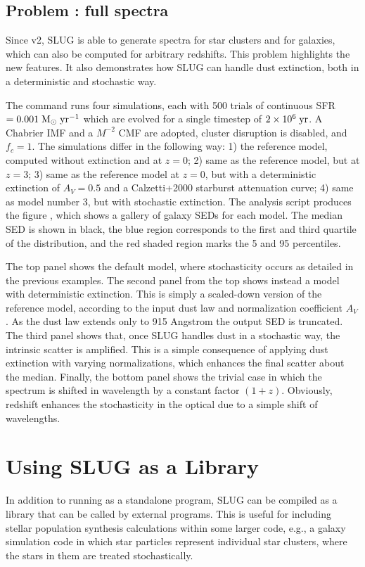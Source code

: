 \documentclass[letterpaper,10pt,english]{sphinxmanual}
\begin{document}
\section{Problem : full spectra}
\label{\detokenize{tests:problem-spectra-full-spectra}}
Since v2, SLUG is able to generate spectra for star clusters and for galaxies, which can also be computed for
arbitrary redshifts. This problem highlights the new features.
It also demonstrates how SLUG can handle dust extinction, both in a deterministic and stochastic way.

The command   runs four  simulations, each with 500 trials
of continuous SFR \(=0.001\rm\;M_\odot\;yr^{-1}\) which are evolved for a
single timestep of  \(2\times 10^6\rm\;yr\). A Chabrier IMF and a \(M^{-2}\)
CMF are adopted, cluster disruption is disabled, and \(f_c = 1\).
The simulations differ in the following way:
1) the reference model, computed without extinction and at \(z = 0\);
2) same as the reference model, but at \(z = 3\);
3) same as the reference model at \(z = 0\), but with a deterministic extinction of \(A_V = 0.5\) and
a Calzetti+2000 starburst attenuation curve;
4) same as model number 3, but with stochastic extinction.
The analysis script  produces the figure ,
which shows a gallery of galaxy SEDs for each model. The median SED is shown in black, the blue region
corresponds to the first and third quartile of the distribution, and the red shaded region
marks the 5 and 95 percentiles.

The top panel shows the default model, where stochasticity occurs as detailed in the previous examples.
The second panel from the top shows instead a model with deterministic extinction. This is simply
a scaled-down version of the reference model, according to the input dust law and normalization
coefficient \(A_V\). As the dust law extends only to 915 Angstrom the output SED is truncated.
The third panel shows that, once SLUG handles dust  in a stochastic way, the intrinsic scatter is
amplified. This is a simple consequence of applying dust extinction with varying normalizations, which
enhances the final scatter about the median. Finally, the bottom panel shows the trivial case in which
the spectrum is shifted in wavelength by a constant factor \((1+z)\). Obviously, redshift enhances
the stochasticity in the optical due to a simple shift of wavelengths.


\chapter{Using SLUG as a Library}
\label{\detokenize{library:using-slug-as-a-library}}\label{\detokenize{library:sec-library-mode}}\label{\detokenize{library::doc}}
In addition to running as a standalone program, SLUG can be
compiled as a library that can be called by external programs. This is
useful for including stellar population synthesis calculations within
some larger code, e.g., a galaxy simulation code in which star
particles represent individual star clusters, where the stars in them
are treated stochastically.
\end{document}
